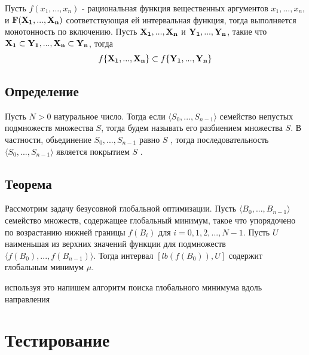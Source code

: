 \documentclass{article}
\begin{document}
    Пусть $f(x_1, ..., x_n)$ - рациональная функция вещественных аргументов $x_1, ..., x_n$, и $\bold{F(X_1, ..., X_n)}$ соответствующая ей интервальная функция, тогда выполняется монотонность по включению.
    Пусть $\bold{X_1},...,\bold{X_n}$ и $\bold{Y_1},...,\bold{Y_n}$, такие что $\bold{X_1} \subset \bold{Y_1},...,\bold{X_n} \subset \bold{Y_n}$, тогда
    \begin{gather*}
        f\{\bold{X_1},...,\bold{X_n}\} \subset f\{\bold{Y_1},...,\bold{Y_n}\}
    \end{gather*}

    \subsection{Определение}

    Пусть $N > 0$  натуральное число. Тогда если $\langle S_0,..., S_{n-1} \rangle$ семейство непустых подмножеств множества $S$, тогда будем называть его разбиением множества $S$. В частности, обьединение $S_0,..., S_{n-1}$ равно $S$ , тогда последовательность $\langle S_0,..., S_{n-1} \rangle$ является покрытием $S$ .

    \subsection{Теорема}

    Рассмотрим задачу безусовной глобальной оптимизации. Пусть $\langle B_0,..., B_{n-1} \rangle$ семейство множеств, содержащее глобальный минимум, такое что упорядочено по возрастанию нижней границы $f(B_i)$ для $i=0, 1, 2,..., N-1$. Пусть $U$ наименьшая из верхних значений функции для подмножеств $\langle f(B_0),..., f(B_{n-1}) \rangle$. Тогда интервал $[lb(f(B_0)), U]$ содержит глобальным минимум $\mu$.


    используя это напишем алгоритм поиска глобального минимума вдоль направления
























    \newpage
    \section{Тестирование}
\end{document}

